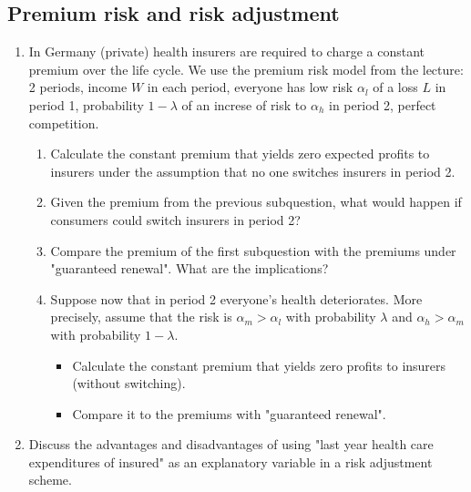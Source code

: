 \documentclass[a4paper]{article}
\begin{document}
\subsection{Premium risk and risk adjustment}
\label{sec:org3d58a67}
\begin{enumerate}[resume]
\item In Germany (private) health insurers are required to charge a constant premium over the life cycle. We use the premium risk model from the lecture: 2 periods, income \(W\) in each period, everyone has low risk \(\alpha_l\) of a loss \(L\) in period 1, probability \(1-\lambda\) of an increse of risk to \(\alpha_h\) in period 2, perfect competition.
\begin{enumerate}
\item Calculate the constant premium that yields zero expected profits to insurers under the assumption that no one switches insurers in period 2.
\item Given the premium from the previous subquestion, what would happen if consumers could switch insurers in period 2?
\item Compare the premium of the first subquestion with the premiums under "guaranteed renewal". What are the implications?
\item Suppose now that in period 2 everyone's health deteriorates. More precisely, assume that the risk is \(\alpha_m>\alpha_l\) with probability \(\lambda\) and \(\alpha_h>\alpha_m\) with probability \(1-\lambda\). 
\begin{itemize}
\item Calculate the constant premium that yields zero profits to insurers (without switching).
\item Compare it to the premiums with "guaranteed renewal".
\end{itemize}
\end{enumerate}

\item Discuss the advantages and disadvantages of using "last year health care expenditures of insured" as an explanatory variable in a risk adjustment scheme.


\end{enumerate}
\end{document}
